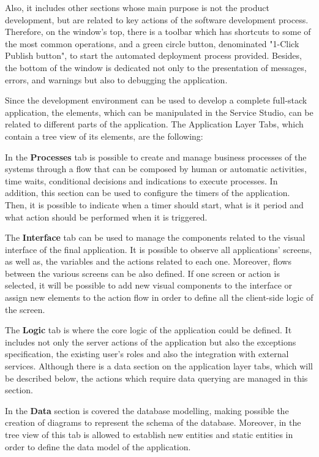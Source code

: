 Also, it includes other sections whose main purpose is not the product development, but are related to key actions of the software development process. Therefore, on the window’s top, there is a toolbar which has shortcuts to some of the most common operations, and a green circle button, denominated "1-Click Publish button", to start the automated deployment process provided. Besides, the bottom of the window is dedicated not only to the presentation of messages, errors, and warnings but also to debugging the application.

Since the development environment can be used to develop a complete full-stack application, the elements, which can be manipulated in the Service Studio, can be related to different parts of the application. The Application Layer Tabs, which contain a tree view of its elements, are the following:

In the \textbf{Processes} tab is possible to create and manage business processes of the systems through a flow that can be composed by human or automatic activities, time waits, conditional decisions and indications to execute processes. In addition, this section can be used to configure the timers of the application. Then, it is possible to indicate when a timer should start, what is it period and what action should be performed when it is triggered.

The \textbf{Interface} tab can be used to manage the components related to the visual interface of the final application. It is possible to observe all applications’ screens, as well as, the variables and the actions related to each one. Moreover, flows between the various screens can be also defined. If one screen or action is selected, it will be possible to add new visual components to the interface or assign new elements to the action flow in order to define all the client-side logic of the screen.

The \textbf{Logic} tab is where the core logic of the application could be defined. It includes not only the server actions of the application but also the exceptions specification, the existing user’s roles and also the integration with external services. Although there is a data section on the application layer tabs, which will be described below, the actions which require data querying are managed in this section.

In the \textbf{Data} section is covered the database modelling, making possible the creation of diagrams to represent the schema of the database. Moreover, in the tree view of this tab is allowed to establish new entities and static entities in order to define the data model of the application.

